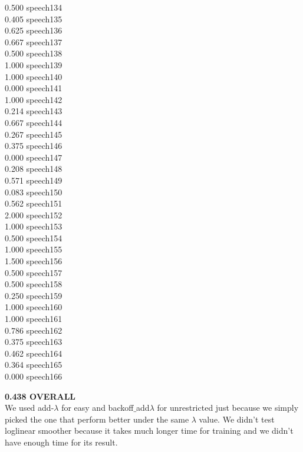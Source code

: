 \documentclass[10pt]{article}
\begin{document}
\begin{enumerate}
\begin{enumerate}
\begin{multicols}{5}
            0.500 speech134\\
            0.405 speech135\\
            0.625 speech136\\
            0.667 speech137\\
            0.500 speech138\\
            1.000 speech139\\
            1.000 speech140\\
            0.000 speech141\\
            1.000 speech142\\
            0.214 speech143\\
            0.667 speech144\\
            0.267 speech145\\
            0.375 speech146\\
            0.000 speech147\\
            0.208 speech148\\
            0.571 speech149\\
            0.083 speech150\\
            0.562 speech151\\
            2.000 speech152\\
            1.000 speech153\\
            0.500 speech154\\
            1.000 speech155\\
            1.500 speech156\\
            0.500 speech157\\
            0.500 speech158\\
            0.250 speech159\\
            1.000 speech160\\
            1.000 speech161\\
            0.786 speech162\\
            0.375 speech163\\
            0.462 speech164\\
            0.364 speech165\\
            0.000 speech166\\
            \end{multicols}
            \textbf{0.438 OVERALL}\\

            We used add-$\lambda$ for easy and backoff$\_$add$\lambda$ for unrestricted just because we simply picked the one that perform better under the same $\lambda$ value. We didn't test loglinear smoother because it takes much longer time for training and we didn't have enough time for its result. 
        \end{enumerate}
        

\end{enumerate}
\end{document}
